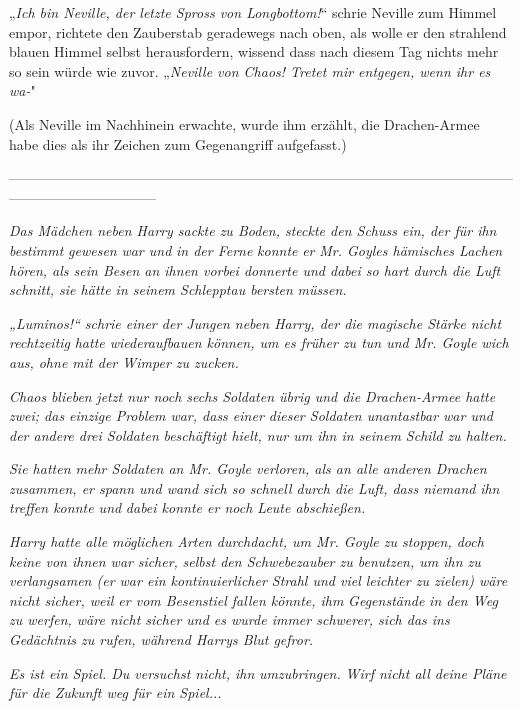 {„\emph{Ich bin Neville, der letzte Spross von Longbottom!}“ schrie Neville zum Himmel empor, richtete den Zauberstab geradewegs nach oben, als wolle er den strahlend blauen Himmel selbst herausfordern, wissend dass nach diesem Tag nichts mehr so sein würde wie zuvor. „\emph{Neville von Chaos! Tretet mir entgegen, wenn ihr es wa-}"

(Als Neville im Nachhinein erwachte, wurde ihm erzählt, die Drachen-Armee habe dies als ihr Zeichen zum Gegenangriff aufgefasst.)

--------------------------------------------------------------------------------------------------------------------------------------------

\hfill\break \emph{Das Mädchen neben Harry sackte zu Boden, steckte den Schuss ein, der für ihn bestimmt} \emph{gewesen} \emph{war und} \emph{in der Ferne} \emph{konnte} \emph{er} \emph{Mr. Goyles hämisches Lachen hören, als sein Besen an ihnen vorbei donnerte und dabei so hart durch die Luft schnitt, sie hätte in seinem Schlepptau bersten} \emph{müssen.}

\emph{„\emph{Luminos!}“ schrie einer der Jungen neben Harry, der die magische Stärke nicht} \emph{rechtzeitig} \emph{hatte wiederaufbauen können, um es früher zu tun und Mr. Goyle wich aus, ohne mit der Wimper zu zucken.}

\emph{Chaos} \emph{blieben} \emph{jetzt nur noch sechs Soldaten übrig und die Drachen-Armee hatte zwei; das einzige Problem war, dass einer dieser Soldaten unantastbar war und der andere drei Soldaten} \emph{beschäftigt hielt, nur um ihn in seinem Schild zu halten.}

\emph{Sie hatten mehr Soldaten an Mr. Goyle verloren, als an alle anderen Drachen zusammen, er spann und wand sich so schnell durch die Luft, dass niemand} \emph{ihn} \emph{treffen konnte und} \emph{\emph{dabei konnte er noch Leute abschießen.}}

\emph{Harry hatte alle möglichen Arten durchdacht, um Mr. Goyle zu stoppen, doch keine von ihnen war} \emph{\emph{sicher,}} \emph{selbst den Schwebezauber zu benutzen, um ihn zu verlangsamen (er war ein kontinuierlicher Strahl und viel leichter zu zielen) wäre nicht sicher, weil er vom Besenstiel fallen könnte, ihm} \emph{Gegenstände} \emph{in den Weg zu werfen, wäre nicht sicher und es wurde immer schwerer, sich das ins Gedächtnis zu rufen, während Harrys Blut gefror.}

\emph{\emph{Es ist ein Spiel. Du versuchst nicht, ihn}} \emph{umzubringen.} \emph{\emph{Wirf nicht all deine Pläne für die Zukunft weg für ein Spiel...}}

}

